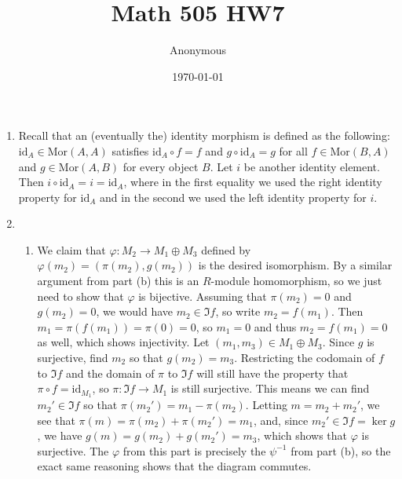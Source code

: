 \documentclass[12pt]{article}
\title{Math 505 HW7}
\date{\today}
\author{Anonymous}
\theoremstyle{definitionstyle}
\def \cph{\varphi}
\newcommand{\id}{\mathrm{id}}
\begin{document}
	\maketitle
	\begin{enumerate}
		\item Recall that an (eventually the) identity morphism is defined as the following: $\mathrm{id}_A \in \mathrm{Mor}(A, A)$ satisfies $\mathrm{id}_A \circ f = f$ and $g \circ \mathrm{id}_A = g$ for all $f \in \mathrm{Mor}(B,A)$ and $g \in \mathrm{Mor}(A, B)$ for every object $B$. Let $i$ be another identity element. Then $i \circ \mathrm{id}_A = i = \mathrm{id}_A$, where in the first equality we used the right identity property for $\mathrm{id}_A$ and in the second we used the left identity property for $i$.
		
		\item \begin{enumerate}
			\item We claim that $\cph: M_2 \to M_1 \oplus M_3$ defined by $\cph(m_2) = (\pi(m_2), g(m_2))$ is the desired isomorphism. By a similar argument from part (b) this is an $R$-module homomorphism, so we just need to show that $\cph$ is bijective. Assuming that $\pi(m_2) = 0$ and $g(m_2) = 0$, we would have $m_2 \in \Im f$, so write $m_2 = f(m_1)$. Then $m_1 = \pi(f(m_1)) = \pi(0) = 0$, so $m_1 = 0$ and thus $m_2 = f(m_1) = 0$ as well, which shows injectivity. Let $(m_1, m_3) \in M_1 \oplus M_3$. Since $g$ is surjective, find $m_2$ so that $g(m_2) = m_3$. Restricting the codomain of $f$ to $\Im f$ and the domain of $\pi$ to $\Im f$ will still have the property that $\pi \circ f = \id_{M_1}$, so $\pi: \Im f \to M_1$ is still surjective. This means we can find $m_2' \in \Im f$ so that $\pi(m_2') = m_1 - \pi(m_2)$. Letting $m = m_2 + m_2'$, we see that $\pi(m) = \pi(m_2) + \pi(m_2') = m_1$, and, since $m_2' \in \Im f = \ker g$, we have $g(m) = g(m_2) + g(m_2') = m_3$, which shows that $\cph$ is surjective. The $\cph$ from this part is precisely the $\psi^{-1}$ from part (b), so the exact same reasoning shows that the diagram commutes.
			

\end{enumerate}
\end{enumerate}
\end{document}
